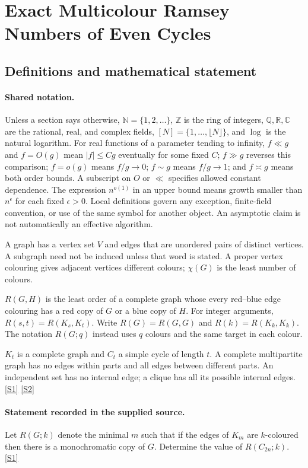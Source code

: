 \documentclass[11pt,a4paper]{article}
\newcommand{\N}{\mathbb{N}}
\newcommand{\Z}{\mathbb{Z}}
\newcommand{\Q}{\mathbb{Q}}
\newcommand{\R}{\mathbb{R}}
\newcommand{\C}{\mathbb{C}}
\newcommand{\sref}[2]{\hyperlink{source:#1:#2}{[S#2]}}
\begin{document}
\section{Exact Multicolour Ramsey Numbers of Even Cycles}\label{statement}


\subsection{Definitions and mathematical statement}

\paragraph{Shared notation.}Unless a section says otherwise, $\N=\{1,2,\ldots\}$,
$\Z$ is the ring of integers, $\Q,\R,\C$ are the rational, real, and complex
fields, $[N]=\{1,\ldots,\lfloor N\rfloor\}$, and $\log$ is the natural
logarithm. For real functions of a parameter tending to infinity,
$f\ll g$ and $f=O(g)$ mean $|f|\leq Cg$ eventually for some fixed $C$;
$f\gg g$ reverses this comparison; $f=o(g)$ means $f/g\to0$;
$f\sim g$ means $f/g\to1$; and $f\asymp g$ means both order bounds.
A subscript on $O$ or $\ll$ specifies allowed constant dependence.
The expression $n^{o(1)}$ in an upper bound means growth smaller than
$n^\epsilon$ for each fixed $\epsilon>0$. Local definitions govern any
exception, finite-field convention, or use of the same symbol for another
object. An asymptotic claim is not automatically an effective algorithm.



A graph has a vertex set $V$ and edges that are unordered pairs of distinct vertices. A subgraph need not be induced unless that word is stated. A proper vertex colouring gives adjacent vertices different colours; $\chi(G)$ is the least number of colours.

$R(G,H)$ is the least order of a complete graph whose every red--blue edge colouring has a red copy of $G$ or a blue copy of $H$. For integer arguments, $R(s,t)=R(K_s,K_t)$. Write $R(G)=R(G,G)$ and $R(k)=R(K_k,K_k)$. The notation $R(G;q)$ instead uses $q$ colours and the same target in each colour.

$K_t$ is a complete graph and $C_t$ a simple cycle of length $t$. A complete multipartite graph has no edges within parts and all edges between different parts. An independent set has no internal edge; a clique has all its possible internal edges. \sref{statement}{1} \sref{statement}{2}

\paragraph{Statement recorded in the supplied source.}
Let $R(G;k)$ denote the minimal $m$ such that if the edges of $K_m$ are $k$-coloured then there is a monochromatic copy of $G$. Determine the value of $ R(C_{2n};k). $ \sref{statement}{1}
\end{document}
